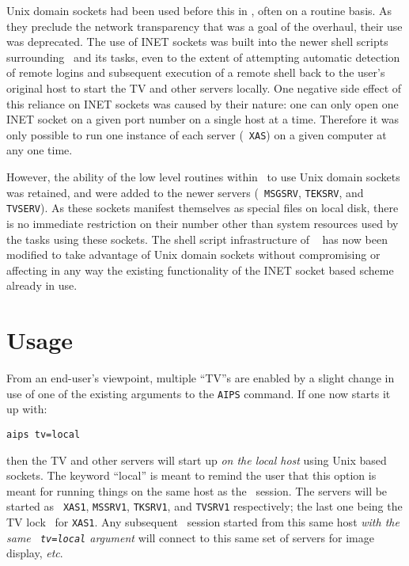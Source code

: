 Unix domain sockets had been used before this in \AIPS, often on a
routine basis.  As they preclude the network transparency that was a
goal of the overhaul, their use was deprecated.  The use of INET sockets
was built into the newer shell scripts surrounding \AIPS\ and its tasks,
even to the extent of attempting automatic detection of remote logins
and subsequent execution of a remote shell back to the user's original
host to start the TV and other servers locally.  One negative side
effect of this reliance on INET sockets was caused by their nature: one
can only open one INET socket on a given port number on a single host at
a time.  Therefore it was only possible to run one instance of each
server (\eg\ {\tt XAS}) on a given computer at any one time.

However, the ability of the low level routines within \AIPS\ to use Unix
domain sockets was retained, and were added to the newer servers ({\tt
MSGSRV}, {\tt TEKSRV}, and {\tt TVSERV}).  As these sockets manifest
themselves as special files on local disk, there is no immediate
restriction on their number other than system resources used by the
tasks using these sockets.  The shell script infrastructure of \AIPS\ %
has now been modified to take advantage of Unix domain sockets without
compromising or affecting in any way the existing functionality of the
INET socket based scheme already in use.

\section{Usage}

From an end-user's viewpoint, multiple ``TV''s are enabled by a slight
change in use of one of the existing arguments to the {\tt AIPS}
command.  If one now starts it up with:

\begin{trivlist}
\item \hskip 2cm {\tt aips tv=local}
\end{trivlist}

\noindent then the TV and other servers will start up {\it on the local
host\/} using Unix based sockets.  The keyword ``local'' is meant to
remind the user that this option is meant for running things on the same
host as the \ttaips\ session.  The servers will be started as {\tt
XAS1}, {\tt MSSRV1}, {\tt TKSRV1}, and {\tt TVSRV1} respectively; the
last one being the TV lock \daemon\ for {\tt XAS1}.  Any subsequent
\ttaips\ session started from this same host {\it with the same \/{\tt
tv=local} argument\/} will connect to this same set of servers for image
display, {\it etc\/}.

